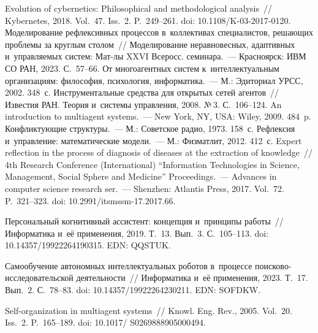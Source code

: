 \begin{multicols}{2}
{{\begin{thebibliography}{99}
   Evolution of cybernetics: Philosophical and methodological analysis~// 
Kybernetes, 2018. Vol.~47. Iss.~2. P.~249--261. doi: 10.1108/K-03-2017-0120.
   Моделирование рефлексивных процессов в~коллективах 
специалистов, решающих проб\-ле\-мы за круглым столом~// Моделирование неравновесных, 
адаптивных и~управляемых систем: Мат-лы XXVI Всеросс. семинара.~--- Красноярск: ИВМ 
СО РАН, 2023. С.~57--66. 
   От многоагентных сис\-тем к~интеллектуальным организациям: 
философия, психология, информатика.~--- М.: Эдиториал УРСС, 2002. 348~с.
Инструментальные средства для открытых сетей агентов~// Известия РАН. Теория и~сис\-те\-мы 
управления, 2008. №\,3. С.~106--124.
   An introduction to multiagent systems.~--- New York, NY, USA: Wiley, 
2009. 484~p.
   Конфликтующие структуры.~--- М.: Советское радио, 1973. 158~с.
   Рефлексия и~управ\-ле\-ние: математические 
модели.~--- М.: Физматлит, 2012. 412~с.
    Expert reflection in the process of diagnosis of diseases at the extraction of 
knowledge~// 4th Research Conference (International)  ``Information Technologies in Science, 
Management, Social Sphere and Medicine'' Proceedings.~--- Advances in computer science 
research ser.~--- Shenzhen: Atlantis Press, 2017. Vol.~72. P.~321--323. doi:  
10.2991/itsmssm-17.2017.66.
  
    Персональный 
когнитивный ассистент: концепция и~принципы работы~// Информатика и~её применения, 
2019. Т.~13. Вып.~3. С.~105--113. doi: 10.14357/19922264190315. EDN: QQSTUK.
  
    Самообучение автономных 
интеллектуальных роботов в~процессе по\-иско\-во-ис\-сле\-до\-ва\-тель\-ской 
дея\-тель\-ности~// Информатика и~её применения, 2023. Т.~17. Вып.~2. С.~78--83. doi: 
10.14357/19922264230211. EDN: \mbox{SOFDKW}.
  
    Self-organization in multiagent 
systems~// Knowl. Eng. Rev., 2005. Vol.~20. Iss.~2. P.~165--189. doi: 
10.1017/ S0269888905000494.
  

\end{thebibliography}}}
\end{multicols}
